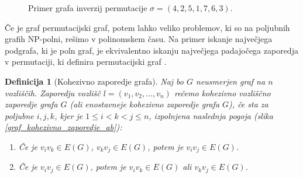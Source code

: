 \documentclass[a4paper, 12pt]{book}
\newtheorem{definicija}{Definicija}[chapter]
\begin{document}
\begin{figure}[h]
    \begin{center}        
    \end{center}
    \caption{Primer grafa inverzij permutacije $\sigma = (4, 2, 5, 1, 7, 6, 3)$.}
    \label{graf_inverzij}
\end{figure}

Če je graf permutacijski graf, potem lahko veliko problemov, ki so na poljubnih grafih NP-polni, rešimo v polinomskem času. Na primer iskanje največjega podgrafa, ki je poln graf, je ekvivalentno iskanju največjega padajočega zaporedja v permutaciji, ki definira permutacijski graf \cite{algorithmGraphTheoryAndPerfectGraphs}.

\begin{definicija}[Kohezivno zaporedje grafa]
\label{def_kohezivno_zaporedje}
    Naj bo $G$ neusmerjen graf na $n$ vozliščih. 
    Zaporedju vozlišč $l = (v_1, v_2, \dots, v_n)$ rečemo kohezivno vozliščno zaporedje grafa $G$ (ali enostavneje kohezivno zaporedje grafa $G$), če sta za poljubne $i, j, k$, kjer je $1 \leq i < k < j \leq n$, izpolnjena naslednja pogoja (slika \ref{graf_kohezivno_zaporedje_ab}):
    \begin{enumerate}[label=(\alph*)]
        \item Če je $v_iv_k \in E(G)$, $v_kv_j \in E(G)$, potem je $v_iv_j \in E(G)$.
        \item Če je $v_iv_j \in E(G)$, potem je $v_iv_k \in E(G)$ ali $v_kv_j \in E(G)$.
    \end{enumerate}
\end{definicija}
\end{document}
